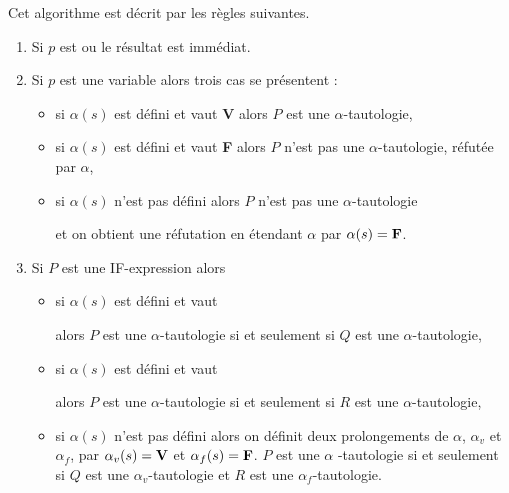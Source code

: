 Cet algorithme est décrit par les règles suivantes.
\begin{enumerate}
\item Si $p$ est  ou  le résultat est immédiat.
\item Si $p$ est une variable  alors trois cas se présentent :
\begin{itemize}
\item si $\alpha(s)$ est défini et vaut {\bf V} alors $P$ est une $\alpha$-tautologie, 
\item si $\alpha(s)$ est défini et vaut {\bf F} alors $P$ n'est pas une $\alpha$-tautologie, réfutée par $\alpha$,
\item si $\alpha(s)$ n'est pas défini alors $P$ n'est pas une $\alpha$-tautologie 

et on obtient une réfutation en étendant $\alpha$ par $\alpha(s)={\bf F}$.
\end{itemize}
\item  Si $P$ est une IF-expression  alors
\begin{itemize}
\item si $\alpha(s)$ est défini et vaut \V

alors $P$ est une $\alpha$-tautologie si et seulement si $Q$ est une $\alpha$-tautologie,
\item si $\alpha(s)$ est défini et vaut \F

alors $P$ est une $\alpha$-tautologie si et seulement si $R$ est une $\alpha$-tautologie,
\item si $\alpha(s)$ n'est pas défini alors on définit deux prolongements de $\alpha$, $\alpha_v$ et $\alpha_f$, par $\alpha_v(s) = {\bf V}$ et  $\alpha_f(s)={\bf F}$. $P$ est une $\alpha$ -tautologie si et seulement si $Q$ est une $\alpha_v$-tautologie et $R$ est une $\alpha_f$-tautologie.
\end{itemize}
\end{enumerate}
